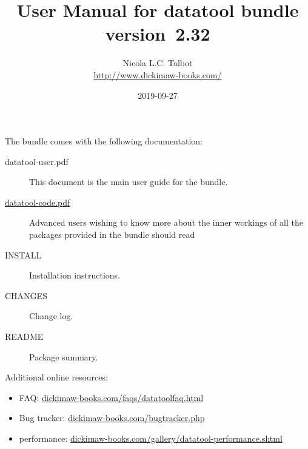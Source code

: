 \documentclass[report,widecs]{nlctdoc}
\begin{document}
\raggedright
\setlength{\parindent}{1em}%


 \title{User Manual for datatool bundle version~2.32}
 \author{Nicola L.C. Talbot\\
\url{http://www.dickimaw-books.com/}}

 \date{2019-09-27}
 \maketitle


\noindent
The  bundle comes with the following documentation:
\begin{description}
  \item[datatool-user.pdf]
  This document is the main user guide for the 
  bundle.

  \item[\url{datatool-code.pdf}]
  Advanced users wishing to know more about the inner workings of
  all the packages provided in the  bundle should
  read 

  \item[INSTALL] Installation instructions.

  \item[CHANGES] Change log.

  \item[README] Package summary.
\end{description}
Additional online resources:
\begin{itemize}
\item {} FAQ:
\href{https://www.dickimaw-books.com/faqs/datatoolfaq.html}{dickimaw-books.com/faqs/datatoolfaq.html}
\item Bug tracker: \href{https://www.dickimaw-books.com/bugtracker.php}{dickimaw-books.com/bugtracker.php}
\item {} performance: \href{https://www.dickimaw-books.com/gallery/datatool-performance.shtml}{dickimaw-books.com/gallery/datatool-performance.shtml}
\end{itemize}
\end{document}
